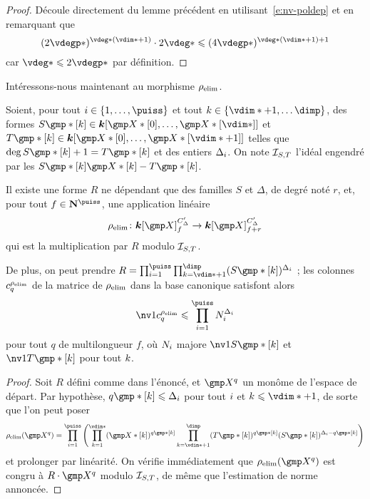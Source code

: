 \begin{proof}
  Découle directement du lemme précédent en utilisant~\eqref{e:nv-poldep} et
  en remarquant que
  \begin{equation}
    ( 2 \vdegp* )^{\vdeg* (\vdim* + 1)} \cdot 2 \vdeg*
    \le
    ( 4 \vdegp* )^{\vdeg* (\vdim* + 1) + 1}
  \end{equation}
  car \( \vdeg* \le 2 \vdegp* \) par définition.
\end{proof}

Intéressons-nous maintenant au morphisme \( \rho\sb{\mathrm{elim}} \).

\begin{lem}
  Soient, pour tout \( \fct \in \{ 1, \dots, \puiss \} \) et tout \( \ind \in
  \{ \vdim* + 1, \dots \dimp \} \), des formes
  \( S\mexp*[\ind] \in \cdn [ \vmp*[0], \dots, \vmp*[\vdim*] ] \) et
  \( T\mexp*[\ind] \in \cdn [ \vmp*[0], \dots, \vmp*[\vdim*+1] ] \)
  telles que \( \deg S\mexp*[\ind] + 1 = T\mexp*[\ind] \) et des entiers
  \( \Delta_i \). On note \( \mathcal I_{S, T} \) l'idéal engendré par les
  \( S\mexp*[\ind] \vmp*[\ind] - T\mexp*[\ind] \).

  Il existe une forme \( R \) ne dépendant que des familles \( S \) et \(
  \Delta \), de degré noté \( r \), et, pour tout \( f \in \N^\puiss \), une
  application linéaire
  \begin{equation}
    \relim \colon
    \cdn [\vmp]_ {f}^{C'_\Delta}
    \to
    \cdn [\vmp]_ {f+r}^{C'_\Delta}
  \end{equation}
  qui est la multiplication par \( R \) modulo \( \mathcal I_{S, T} \).

  De plus, on peut prendre
  \( R = \prod\fctrange \prod_{\ind = \vdim*+1}^{\dimp}
    ( S\mexp*[\ind] )^{\Delta_\fct} \) ; les colonnes \( c_q^{\rho\sb{\mathrm{elim}}} \) de la
  matrice de \( \rho\sb{\mathrm{elim}} \) dans la base canonique satisfont alors
  \begin{equation}
    \nv1{ c_q^{\relim} }
    \le
    \prod\fctrange N_\fct^{\Delta_\fct}
  \end{equation}
  pour tout \( q \) de multilongueur \( f \), où \( N_i \) majore
  \( \nv1{ S\mexp*[\ind] } \) et \( \nv1{ T\mexp*[\ind] } \) pour tout
  \( k \).
\end{lem}

\begin{proof}
  Soit \( R \) défini comme dans l'énoncé, et \( \vmp^q \) un monôme de
  l'espace de départ. Par hypothèse, \( q\mexp*[\ind] \le \Delta_\fct \) pour
  tout \( i \) et \( \ind \le \vdim* + 1 \), de sorte que l'on peut poser
  \begin{equation}
    \relim( \vmp^q )
    =
    \prod\fctrange \left(
    \prod_{\ind=1}^{\vdim*}
    (\vmp*[\ind])^{q\mexp*[\ind]}
    \prod_{\ind=\vdim*+1}^\dimp
    (T\mexp*[\ind])^{q\mexp*[\ind]}
    (S\mexp*[\ind])^{\Delta_\fct - q\mexp*[\ind]}
    \right)
  \end{equation}
  et prolonger par linéarité. On vérifie immédiatement que \( \relim(\vmp^q)
  \) est congru à \( R \cdot \vmp^q \) modulo \( \mathcal I_{S, T} \), de même
  que l'estimation de norme annoncée.
\end{proof}


